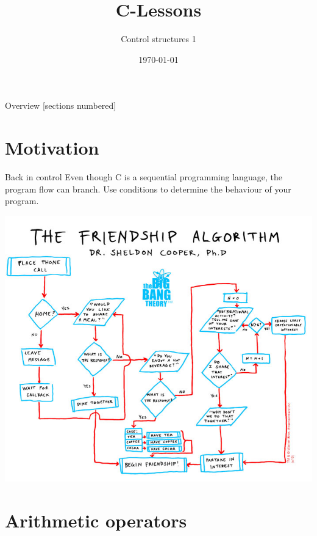 


\title{C-Lessons}
\subtitle{Control structures 1}
\date{\today}



\begin{frame}
	\titlepage
\end{frame}
\begin{frame}{Overview}
	[sections numbered]
	\tableofcontents
\end{frame}

\section{Motivation}

\begin{frame}{Back in control}
	Even though C is a sequential programming language, the program flow can branch.
	Use conditions to determine the behaviour of your program.
	\centerline{\includegraphics[scale=.27]{../img/friendship.jpg}}
\end{frame}

\section{Arithmetic operators}

